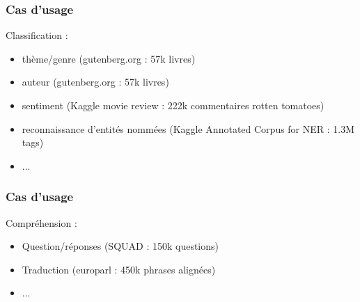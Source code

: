 \begin{frame}
  \frametitle{Cas d'usage}
  Classification :
  \begin{itemize}
  \item thème/genre (gutenberg.org : 57k livres)
  \item auteur (gutenberg.org : 57k livres)
  \item sentiment (Kaggle movie review : 222k commentaires rotten tomatoes)
  \item reconnaissance d'entités nommées (Kaggle Annotated Corpus for NER : 1.3M tags)
  \item ...
  \end{itemize}
\end{frame}

\begin{frame}
  \frametitle{Cas d'usage}
  Compréhension :
  \begin{itemize}
  \item Question/réponses (SQUAD : 150k questions)
  \item Traduction (europarl : 450k phrases alignées)
  \item ...
  \end{itemize}
\end{frame}
